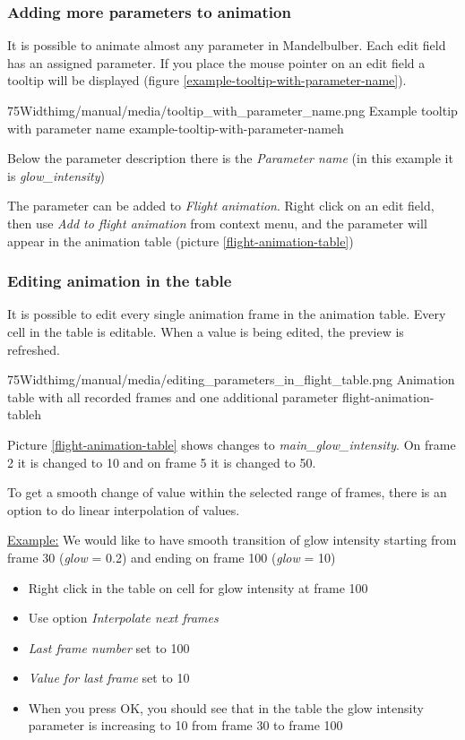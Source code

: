 	\subsubsection{Adding more parameters to animation}
	
	It is possible to animate almost any parameter in Mandelbulber. Each edit field has an assigned parameter. If you place the mouse pointer on an edit field a tooltip will be displayed (figure \ref{example-tooltip-with-parameter-name}). 
	
	\simpleImageWithCaption75Width{img/manual/media/tooltip_with_parameter_name.png}
	{Example tooltip with parameter name}
	{example-tooltip-with-parameter-name}{h}
		
	Below the parameter description there is the \emph{Parameter name} (in this example it is \emph{glow\_intensity})
	
	The parameter can be added to \emph{Flight animation}. Right click on an edit field, then use \emph{Add to flight animation} from context menu, and the parameter will appear in the animation table  (picture \ref{flight-animation-table})
			
	\subsubsection{Editing animation in the table}
	
	It is possible to edit every single animation frame in the animation table. Every cell in the table is editable.  When a value is being edited, the preview is refreshed.
	
		\simpleImageWithCaption75Width{img/manual/media/editing_parameters_in_flight_table.png}
	{Animation table with all recorded frames and one additional parameter}
	{flight-animation-table}{h}
	
	Picture \ref{flight-animation-table} shows changes to \emph{main\_glow\_intensity}. On frame 2 it is changed to 10 and on frame 5 it is changed to 50.
	
	To get a smooth change of value within the selected range of frames, there is an option to do linear interpolation of values. 
	
	\underline{Example:} We would like to have smooth transition of glow intensity starting from frame 30 (\emph{glow} = 0.2) and ending on frame 100 (\emph{glow} = 10)
	\begin{itemize}
		\item Right click in the table on cell for glow intensity at frame 100
		\item Use option  \emph{Interpolate next frames}
		\item \emph{Last frame number} set to 100
		\item \emph{Value for last frame} set to 10
		\item When you press OK, you should see that in the table the glow intensity parameter is increasing to 10 from frame 30 to frame 100
	\end{itemize} 
	
